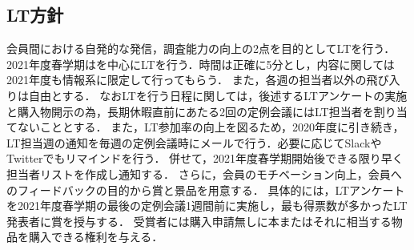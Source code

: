\subsection*{LT方針}


会員間における自発的な発信，調査能力の向上の2点を目的としてLTを行う．
2021年度春学期は\secondGrade{}を中心にLTを行う．時間は正確に5分とし，内容に関しては2021年度も情報系に限定して行ってもらう．
また，各週の担当者以外の飛び入りは自由とする．
なおLTを行う日程に関しては，後述するLTアンケートの実施と購入物開示の為，長期休暇直前にあたる2回の定例会議にはLT担当者を割り当てないこととする．
また，LT参加率の向上を図るため，2020年度に引き続き，LT担当週の通知を毎週の定例会議時にメールで行う．必要に応じてSlackやTwitterでもリマインドを行う．
併せて，2021年度春学期開始後できる限り早く担当者リストを作成し通知する．
さらに，会員のモチベーション向上，会員へのフィードバックの目的から賞と景品を用意する．
具体的には，LTアンケートを2021年度春学期の最後の定例会議1週間前に実施し，最も得票数が多かったLT発表者に賞を授与する．
受賞者には購入申請無しに本またはそれに相当する物品を購入できる権利を与える．
